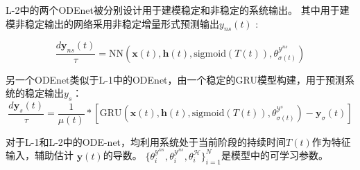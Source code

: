 L-2中的两个ODEnet被分别设计用于建模稳定和非稳定的系统输出。
其中用于建模非稳定输出的网络采用非稳定增量形式预测输出$y_{ns}(t)$ :

\begin{equation}
    \label{equ:dyns}
    \frac{d \boldsymbol{y}_{ns}(t)}{\tau} = \text{NN}(\boldsymbol{x}(t), \boldsymbol{h}(t), \text{sigmoid}(T(t)), \theta^{\mathcal{Y}^{ns}}_{\sigma(t)})
\end{equation}

另一个ODEnet类似于L-1中的ODEnet，由一个稳定的GRU模型构建，用于预测系统的稳定输出$y_s$：
\begin{equation}
    \label{equ:dys}
    \frac{d \boldsymbol{y}_{s}(t)}{\tau} = \frac{1}{\mu(t)}*\left[\text{GRU}(\boldsymbol{x}(t), \boldsymbol{h}(t), \text{sigmoid}(T(t)), \theta^{\mathcal{Y}^{s}}_{\sigma(t)}) - \boldsymbol{y}_\sigma(t)\right]
\end{equation}

对于L-1和L-2中的ODE-net，均利用系统处于当前阶段的持续时间$T(t)$作为特征输入，辅助估计 $\boldsymbol{y}(t)$的导数。
$\{\theta_i^{\mathcal{Y}^{ns}},\theta_i^{\mathcal{Y}^{ns}},\theta_i^{\mathcal{H}}\}_{i=1}^N$是模型中的可学习参数。

